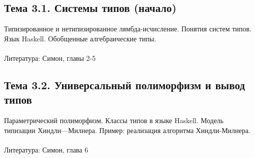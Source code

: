 \documentclass[a4paper,11pt]{article}
\begin{document}
\subsection*{Тема 3.1. Системы типов (начало)}
Типизированное и нетипизированное лямбда-исчисление. Понятия систем типов. Язык Haskell. 
Обобщенные алгебраические типы.
\\\\
Литература: Симон, главы 2-5

\subsection*{Тема 3.2. Универсальный полиморфизм и вывод типов}
Параметрический полиморфизм. Классы типов в языке Haskell. Модель типизации Хиндли—Милнера. Пример: реализация алгоритма Хиндли-Милнера.
\\\\
Литература: Симон, глава 6
\end{document}

